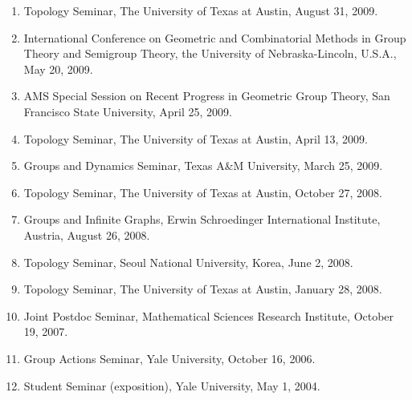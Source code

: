 \documentclass[11pt,a4paper]{article}
\begin{document}
\begin{enumerate}[leftmargin=1.5em, label=\arabic*.]
\item Topology Seminar, The University of Texas at Austin, August 31, 2009.
\item International Conference on Geometric and Combinatorial Methods in Group Theory and Semigroup Theory, the University of Nebraska-Lincoln, U.S.A., May 20, 2009.
\item AMS Special Session on Recent Progress in Geometric Group Theory, San Francisco State University, April 25, 2009.
\item Topology Seminar, The University of Texas at Austin, April 13, 2009.
\item Groups and Dynamics Seminar, Texas A\&M University, March 25, 2009.
\item Topology Seminar, The University of Texas at Austin, October 27, 2008.
\item Groups and Infinite Graphs, Erwin Schroedinger International Institute, Austria, August 26, 2008.
\item Topology Seminar, Seoul National University, Korea, June 2, 2008.
\item Topology Seminar, The University of Texas at Austin, January 28, 2008.
\item Joint Postdoc Seminar, Mathematical Sciences Research Institute, October 19, 2007.
\item Group Actions Seminar, Yale University, October 16, 2006.
\item Student Seminar (exposition), Yale University, May 1, 2004.
\end{enumerate}
\end{document}
